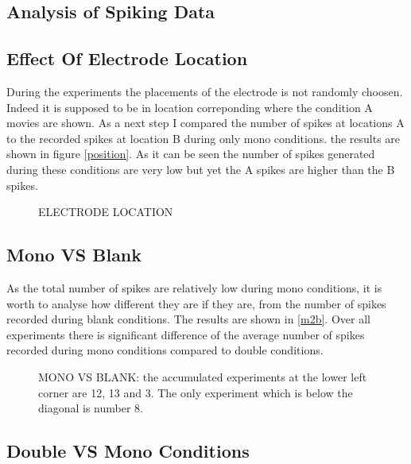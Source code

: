 \subsection{Analysis of Spiking Data} 



\label{oi_local_spike}

\subsection{Effect Of Electrode Location}



During the experiments the placements of the electrode is not randomly choosen. Indeed it is supposed to be in location correponding where the condition A movies are shown. As a next step I compared the number of spikes at locations A to the recorded spikes at location B during only mono conditions. the results are shown in figure \ref{position}. As it can be seen the number of spikes generated during these conditions are very low but yet the A spikes are higher than the B spikes. 

\begin{figure}[!htb]
\centerline{
}
\caption{ELECTRODE LOCATION} 
\end{figure}


\subsection{Mono VS Blank}

As the total number of spikes are relatively low during mono conditions, it is worth to analyse how different they are if they are, from the number of spikes recorded during blank conditions. The results are shown in \ref{m2b}. Over all experiments there is significant difference of the average number of spikes recorded during mono conditions compared to double conditions.

\begin{figure}[!htb]
\centerline{
}
\caption{MONO VS BLANK: the accumulated experiments at the lower left corner are 12, 13 and 3. The only experiment which is below the diagonal is number 8.} 
\end{figure}



\subsection{Double VS Mono Conditions}

